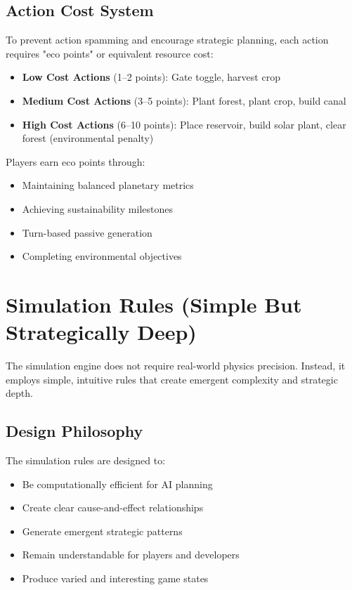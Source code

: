 \documentclass[12pt,a4paper]{article}
\begin{document}
\subsection{Action Cost System}

To prevent action spamming and encourage strategic planning, each action requires "eco points" or equivalent resource cost:

\begin{itemize}
    \item \textbf{Low Cost Actions} (1--2 points): Gate toggle, harvest crop
    \item \textbf{Medium Cost Actions} (3--5 points): Plant forest, plant crop, build canal
    \item \textbf{High Cost Actions} (6--10 points): Place reservoir, build solar plant, clear forest (environmental penalty)
\end{itemize}

Players earn eco points through:
\begin{itemize}
    \item Maintaining balanced planetary metrics
    \item Achieving sustainability milestones
    \item Turn-based passive generation
    \item Completing environmental objectives
\end{itemize}

\section{Simulation Rules (Simple But Strategically Deep)}

The simulation engine does not require real-world physics precision. Instead, it employs simple, intuitive rules that create emergent complexity and strategic depth.

\subsection{Design Philosophy}

The simulation rules are designed to:
\begin{itemize}
    \item Be computationally efficient for AI planning
    \item Create clear cause-and-effect relationships
    \item Generate emergent strategic patterns
    \item Remain understandable for players and developers
    \item Produce varied and interesting game states
\end{itemize}
\end{document}
